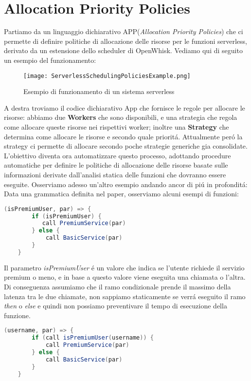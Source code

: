 \documentclass[../../main.tex]{subfiles}
\begin{document}
\section{Allocation Priority Policies}
Partiamo da un linguaggio dichiarativo APP(\textit{Allocation Priority Policies}) che ci permette di definire politiche di allocazione delle risorse per le funzioni serverless, derivato da un estensione dello scheduler di OpenWhisk.
Vediamo qui di seguito un esempio del funzionamento:
\begin{figure}[H]
   \centering
    \texttt{[image: ServerlessSchedulingPoliciesExample.png]}
    \caption{Esempio di funzionamento di un sistema serverless \autocite{deserverless}}
\end{figure}
A destra troviamo il codice dichiarativo App che fornisce le regole per allocare le risorse: abbiamo due \textbf{Workers} che sono disponibili, e una strategia che regola come allocare queste risorse nei rispettivi worker; inoltre una \textbf{Strategy} che determina come allocare le risorse e secondo quale prioritá.
Attualmente peró la strategy ci permette di allocare secondo poche strategie generiche gia consolidate.
L'obiettivo diventa ora automatizzare questo processo, adottando procedure automatiche per definire le politiche di allocazione delle risorse basate sulle informazioni derivate dall'analisi statica delle funzioni che dovranno essere eseguite.
Osserviamo adesso un'altro esempio andando ancor di piú in profonditá:
Data una grammatica definita nel paper\autocite {deserverless}, osserviamo alcuni esempi di funzioni:
\begin{lstlisting}[language=Java, caption= La guardia della condizione é un espressione,label={lst:1}]
    (isPremiumUser, par) => {
        if (isPremiumUser) {
           call PremiumService(par)
        } else {
            call BasicService(par)
        }
    }
\end{lstlisting}

Il parametro \textit{isPremiumUser} é un valore che indica se l'utente richiede il servizio premium o meno, e in base a questo valore viene eseguita una chiamata o l'altra.
Di conseguenza assumiamo che il ramo condizionale prende il massimo della latenza tra le due chiamate, non sappiamo staticamente se verrá eseguito il ramo \textit{then} o \textit{else} e quindi non possiamo preventivare il tempo di esecuzione della funzione.

\begin{lstlisting}[language=Java, caption= La guardia della condizione é un'invocazione a un servizio esterno,label={lst:2}]
    (username, par) => {
        if (call isPremiumUser(username)) {
            call PremiumService(par)
        } else {
            call BasicService(par)
        }
    }
\end{lstlisting}
\end{document}
